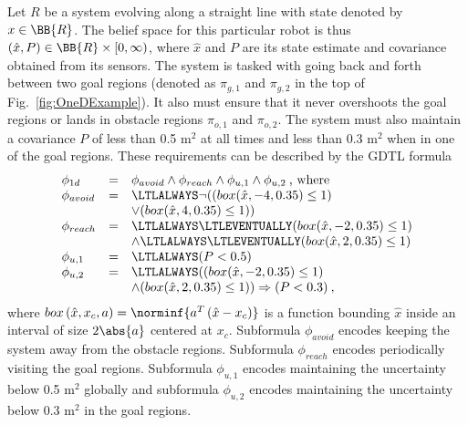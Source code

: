 \begin{example}
\label{ex:running}
Let $R$ be a system evolving along a straight line
with state denoted by $x \in \BB{R}$.
The belief space for this particular robot is thus
$(\hat{x}, P) \in \BB{R} \times [0, \infty)$,
where $\hat{x}$ and $P$ are its state estimate
and covariance obtained from its sensors.  
The system is tasked with going back and forth
between two goal regions (denoted as $\pi_{g,1}$
and $\pi_{g,2}$ in the top of Fig.~\ref{fig:OneDExample}).  
It also must ensure that it never overshoots the goal
regions or lands in obstacle regions $\pi_{o,1}$
and $\pi_{o,2}$.
The system must also %
maintain a
covariance $P$ of less than 0.5 m$^2$ at all times
and less than 0.3 m$^2$ when in one of the goal regions.
These requirements can be described by the GDTL formula
\begin{equation}
\label{eq:onedformula}
\begin{array}{lcl}
 \phi_{1d} &=& \phi_{avoid}  \wedge \phi_{reach}  \wedge \phi_{u,1} \wedge \phi_{u,2}\:\mbox{, where}   \\
 \phi_{avoid}  &=& \LTLALWAYS \neg ((box(\hat{x},-4,0.35)\leq 1) \\
 & &\vee (box(\hat{x},4,0.35)\leq 1) ) \\
 \phi_{reach} &=& \LTLALWAYS \LTLEVENTUALLY (box(\hat{x},-2,0.35)\leq 1)  \\ 
 & & \wedge \LTLALWAYS \LTLEVENTUALLY (box(\hat{x},2,0.35)\leq 1) \\
 \phi_{u,1} &=& \LTLALWAYS ( P < 0.5) \\
 \phi_{u,2} &=&  \LTLALWAYS ( (box(\hat{x},-2,0.35)\leq 1)  \\ & & 
 \wedge (box(\hat{x},2,0.35)\leq 1)) \Rightarrow (P < 0.3)\:,
\end{array}
 \end{equation}
where $box\left(\hat{x},x_c,a\right)=\norminf{a^T\left(\hat{x}-x_c\right)}$
is a function bounding $\hat{x}$ inside an interval of size $2\abs{a}$ centered at $x_c$.
Subformula $\phi_{avoid}$ encodes keeping the system away from the obstacle regions.
Subformula $\phi_{reach}$ encodes periodically visiting the goal regions.  
Subformula $\phi_{u,1}$ encodes maintaining the uncertainty below 0.5 m$^2$ 
globally and subformula $\phi_{u,2}$ encodes maintaining the uncertainty below
0.3 m$^2$ in the goal regions.


\end{example}
